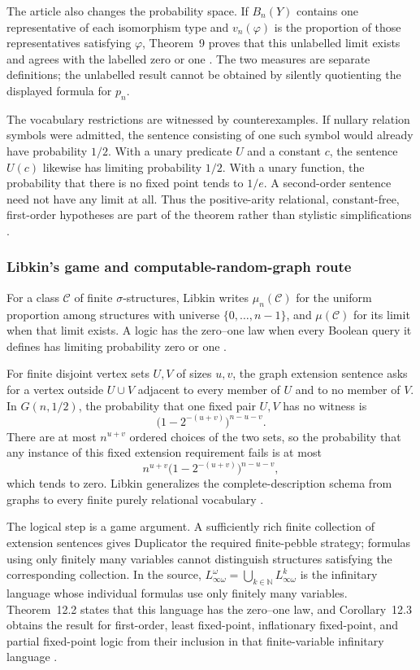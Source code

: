 The article also changes the probability space.  If \(B_n(Y)\) contains one
representative of each isomorphism type and \(v_n(\varphi)\) is the proportion
of those representatives satisfying \(\varphi\), Theorem~9 proves that this
unlabelled limit exists and agrees with the labelled zero or one
\cite[pp.~54--55]{Fagin1976}.  The two measures are separate definitions; the
unlabelled result cannot be obtained by silently quotienting the displayed
formula for \(p_n\).

The vocabulary restrictions are witnessed by counterexamples.  If nullary
relation symbols were admitted, the sentence consisting of one such symbol
would already have probability \(1/2\).  With a unary predicate \(U\) and a
constant \(c\), the sentence \(U(c)\) likewise has limiting probability
\(1/2\).  With a unary function, the probability that there is no fixed point
tends to \(1/e\).  A second-order sentence need not have any limit at all.
Thus the positive-arity relational, constant-free, first-order hypotheses are
part of the theorem rather than stylistic simplifications
\cite[pp.~55--57]{Fagin1976}.

\subsubsection{Libkin's game and computable-random-graph route}

For a class \(\mathcal C\) of finite \(\sigma\)-structures, Libkin writes
\(\mu_n(\mathcal C)\) for the uniform proportion among structures with
universe \(\{0,\ldots,n-1\}\), and \(\mu(\mathcal C)\) for its limit when
that limit exists.  A logic has the zero--one law when every Boolean query it
defines has limiting probability zero or one
\cite[def.~12.1]{Libkin2004}.

For finite disjoint vertex sets \(U,V\) of sizes \(u,v\), the graph extension
sentence asks for a vertex outside \(U\cup V\) adjacent to every member of
\(U\) and to no member of \(V\).  In \(G(n,1/2)\), the probability that one
fixed pair \(U,V\) has no witness is
\[
 \bigl(1-2^{-(u+v)}\bigr)^{n-u-v}.
\]
There are at most \(n^{u+v}\) ordered choices of the two sets, so the
probability that any instance of this fixed extension requirement fails is at
most
\[
 n^{u+v}\bigl(1-2^{-(u+v)}\bigr)^{n-u-v},
\]
which tends to zero.  Libkin generalizes the complete-description schema from
graphs to every finite purely relational vocabulary
\cite[prop.~12.4 and pp.~240--241]{Libkin2004}.

The logical step is a game argument.  A sufficiently rich finite collection
of extension sentences gives Duplicator the required finite-pebble strategy;
formulas using only finitely many variables cannot distinguish structures
satisfying the corresponding collection.  In the source,
\(L^{\omega}_{\infty\omega}=\bigcup_{k\in\mathbb N}L^k_{\infty\omega}\)
is the infinitary language whose individual formulas use only finitely many
variables.  Theorem~12.2 states that this language has the zero--one law, and
Corollary~12.3 obtains the result for first-order, least fixed-point,
inflationary fixed-point, and partial fixed-point logic from their inclusion in
that finite-variable infinitary language
\cite[def.~11.1, thm.~11.2, thm.~12.2, and cor.~12.3]{Libkin2004}.

